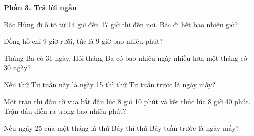 \textbf{Phần 3. Trả lời ngắn}

\begin{ex} %
Bác Hùng đi ô tô từ 14 giờ đến 17 giờ thì đến nơi. Bác đi hết bao nhiêu giờ?
\end{ex}

\begin{ex} %
Đồng hồ chỉ 9 giờ rưỡi, tức là 9 giờ bao nhiêu phút?
\end{ex}

\begin{ex} %
Tháng Ba có 31 ngày. Hỏi tháng Ba có bao nhiêu ngày nhiều hơn một tháng có 30 ngày?
\end{ex}

\begin{ex} %
Nếu thứ Tư tuần này là ngày 15 thì thứ Tư tuần trước là ngày mấy?
\end{ex}

\begin{ex} %
Một trận thi đấu cờ vua bắt đầu lúc 8 giờ 10 phút và kết thúc lúc 8 giờ 40 phút. Trận đấu diễn ra trong bao nhiêu phút?
\end{ex}

\begin{ex} %
Nếu ngày 25 của một tháng là thứ Bảy thì thứ Bảy tuần trước là ngày mấy?
\end{ex}
